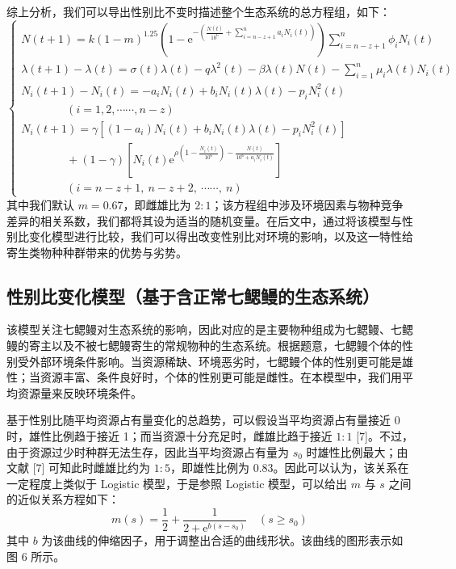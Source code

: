\documentclass[11pt,a4paper]{ctexart}
\begin{document}
综上分析，我们可以导出性别比不变时描述整个生态系统的总方程组，如下：
\begin{equation}
\begin{cases}
N(t+1)=k(1-m)^{1.25}\left(1-\mathrm{e}^{-\left(\frac{N(t)}{10^{6}}+\sum\limits_{i=n-z+1}^{n}a_{i}N_{i}(t)\right)}\right)\sum\limits_{i=n-z+1}^{n}\phi_{i}N_{i}(t)\\[6pt]
\lambda(t+1)-\lambda(t)=\sigma(t)\lambda(t)-q\lambda^{2}(t)-\beta\lambda(t)N(t)-\sum\limits_{i=1}^{n}\mu_{i}\lambda(t)N_{i}(t)\\[6pt]
N_{i}(t+1)-N_{i}(t)=-a_{i}N_{i}(t)+b_{i}N_{i}(t)\lambda(t)-p_{i}N_{i}^{2}(t)\\[4pt]
\qquad\qquad (i=1,2,\cdots\cdots,n-z)\\[6pt]
N_{i}(t+1)=\gamma\left[(1-a_{i})N_{i}(t)+b_{i}N_{i}(t)\lambda(t)-p_{i}N_{i}^{2}(t)\right]\\[4pt]
\qquad\qquad +(1-\gamma)\left[N_{i}(t)\mathrm{e}^{\rho\left(1-\frac{N_{i}(t)}{10^{6}}\right)-\frac{N(t)}{10^{6}+a_{i}N_{i}(t)}}\right]\\[4pt]
\qquad\qquad (i=n-z+1,\ n-z+2,\ \cdots\cdots,\ n)
\end{cases}
\end{equation}
其中我们默认 $m=0.67$，即雌雄比为 $2:1$；该方程组中涉及环境因素与物种竞争差异的相关系数，我们都将其设为适当的随机变量。在后文中，通过将该模型与性别比变化模型进行比较，我们可以得出改变性别比对环境的影响，以及这一特性给寄生类物种种群带来的优势与劣势。

\subsection{性别比变化模型（基于含正常七鳃鳗的生态系统）}

该模型关注七鳃鳗对生态系统的影响，因此对应的是主要物种组成为七鳃鳗、七鳃鳗的寄主以及不被七鳃鳗寄生的常规物种的生态系统。根据题意，七鳃鳗个体的性别受外部环境条件影响。当资源稀缺、环境恶劣时，七鳃鳗个体的性别更可能是雄性；当资源丰富、条件良好时，个体的性别更可能是雌性。在本模型中，我们用平均资源量来反映环境条件。

基于性别比随平均资源占有量变化的总趋势，可以假设当平均资源占有量接近 0 时，雄性比例趋于接近 1；而当资源十分充足时，雌雄比趋于接近 $1:1$ [7]。不过，由于资源过少时种群无法生存，因此当平均资源占有量为 $s_{0}$ 时雄性比例最大；由文献 [7] 可知此时雌雄比约为 $1:5$，即雄性比例为 0.83。因此可以认为，该关系在一定程度上类似于 Logistic 模型，于是参照 Logistic 模型，可以给出 $m$ 与 $s$ 之间的近似关系方程如下：
\begin{equation}
m(s)=\frac{1}{2}+\frac{1}{2+\mathrm{e}^{b(s-s_{0})}}\quad (s\ge s_{0})
\end{equation}
其中 $b$ 为该曲线的伸缩因子，用于调整出合适的曲线形状。该曲线的图形表示如图 6 所示。
\end{document}
